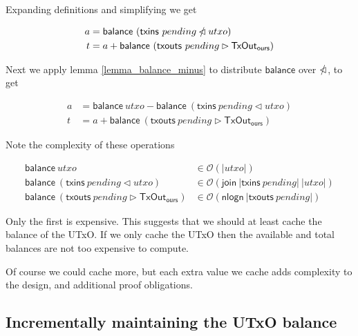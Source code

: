 \documentclass{article}
\newcommand{\order}[1]{\mathcal{O}\left(#1\right)}
\newcommand{\restrictdom}{\lhd}
\newcommand{\subtractdom}{\mathbin{\slashed{\restrictdom}}}
\newcommand{\restrictrange}{\rhd}
\begin{document}
Expanding definitions and simplifying we get

\begin{equation*}
\begin{split}
a & = \mathsf{balance} ~ (\mathsf{txins} ~ pending \subtractdom utxo) \\
t & = a + \mathsf{balance} ~ (\mathsf{txouts} ~ pending \restrictrange \mathsf{TxOut_{ours}})
\end{split}
\end{equation*}

Next we apply lemma \ref{lemma_balance_minus} to distribute $\mathsf{balance}$
over $\subtractdom$, to get

\begin{equation*}
\begin{split}
a & = \mathsf{balance} ~ utxo - \mathsf{balance} ~ (\mathsf{txins} ~ pending \restrictdom utxo) \\
t & = a + \mathsf{balance} ~ (\mathsf{txouts} ~ pending \restrictrange \mathsf{TxOut_{ours}})
\end{split}
\end{equation*}

Note the complexity of these operations

\begin{equation*}
\begin{split}
\mathsf{balance} ~ utxo & \in \order{|utxo|} \\
\mathsf{balance} ~ (\mathsf{txins} ~ pending \restrictdom utxo) & \in \order{\mathsf{join} ~ |\mathsf{txins}~ pending| ~ |utxo|} \\
\mathsf{balance} ~ (\mathsf{txouts} ~ pending \restrictrange \mathsf{TxOut_{ours}}) & \in \order{\mathsf{nlogn} ~ |\mathsf{txouts}~ pending|}
\end{split}
\end{equation*}

Only the first is expensive. This suggests that we should at least cache the
balance of the UTxO. If we only cache the UTxO then the available and total
balances are not too expensive to compute.

Of course we could cache more, but each extra value we cache adds complexity to
the design, and additional proof obligations.

\subsection{Incrementally maintaining the UTxO balance}
\label{sec:applyBlock_incr}
\end{document}
